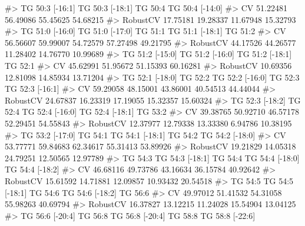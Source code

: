 \documentclass[
  letterpaper,
  DIV=11,
  numbers=noendperiod]{scrreprt}
\newenvironment{Shaded}{\begin{snugshade}}{\end{snugshade}}
\newcommand{\CommentTok}[1]{\textcolor[rgb]{0.37,0.37,0.37}{#1}}
\begin{document}
\begin{Shaded}
\begin{Highlighting}[]
\CommentTok{\#\textgreater{}          TG 50:3 [{-}16:1] TG 50:3 [{-}18:1]  TG 50:4 TG 50:4 [{-}14:0]}
\CommentTok{\#\textgreater{} CV              51.22481        56.49086 55.45625        54.68215}
\CommentTok{\#\textgreater{} RobustCV        17.75181        19.28337 11.67948        15.32793}
\CommentTok{\#\textgreater{}          TG 51:0 [{-}16:0] TG 51:0 [{-}17:0]  TG 51:1 TG 51:1 [{-}18:1]  TG 51:2}
\CommentTok{\#\textgreater{} CV              56.56607        59.99007 54.72579        57.27498 49.21795}
\CommentTok{\#\textgreater{} RobustCV        44.17526        44.26577 11.28402        14.76770 10.99689}
\CommentTok{\#\textgreater{}          TG 51:2 [{-}15:0] TG 51:2 [{-}16:0] TG 51:2 [{-}18:1]  TG 52:1}
\CommentTok{\#\textgreater{} CV              45.62991        51.95672        51.15393 60.16281}
\CommentTok{\#\textgreater{} RobustCV        10.69356        12.81098        14.85934 13.71204}
\CommentTok{\#\textgreater{}          TG 52:1 [{-}18:0]  TG 52:2 TG 52:2 [{-}16:0]  TG 52:3 TG 52:3 [{-}16:1]}
\CommentTok{\#\textgreater{} CV              59.29058 48.15001        43.86001 40.54513        44.44044}
\CommentTok{\#\textgreater{} RobustCV        24.67837 16.23319        17.19055 15.32357        15.60324}
\CommentTok{\#\textgreater{}          TG 52:3 [{-}18:2]  TG 52:4 TG 52:4 [{-}16:0] TG 52:4 [{-}18:1]  TG 53:2}
\CommentTok{\#\textgreater{} CV              39.38765 50.92710        46.57178        52.29451 54.55843}
\CommentTok{\#\textgreater{} RobustCV        12.37977 12.79338        13.33380         6.94786 10.38195}
\CommentTok{\#\textgreater{}          TG 53:2 [{-}17:0]  TG 54:1 TG 54:1 [{-}18:1]  TG 54:2 TG 54:2 [{-}18:0]}
\CommentTok{\#\textgreater{} CV              53.77771 59.84683        62.34617 55.31413        53.89926}
\CommentTok{\#\textgreater{} RobustCV        19.21829 14.05318        24.79251 12.50565        12.97789}
\CommentTok{\#\textgreater{}           TG 54:3 TG 54:3 [{-}18:1]  TG 54:4 TG 54:4 [{-}18:0] TG 54:4 [{-}18:2]}
\CommentTok{\#\textgreater{} CV       46.68116        49.73786 43.16634        36.15784        40.92642}
\CommentTok{\#\textgreater{} RobustCV 15.61592        14.71881 12.09857        10.93432        20.54518}
\CommentTok{\#\textgreater{}           TG 54:5 TG 54:5 [{-}18:1]  TG 54:6 TG 54:6 [{-}18:2]  TG 56:6}
\CommentTok{\#\textgreater{} CV       49.97012        51.41532 54.31058        55.98263 40.69794}
\CommentTok{\#\textgreater{} RobustCV 16.37827        13.12215 11.24028        15.54904 13.04125}
\CommentTok{\#\textgreater{}          TG 56:6 [{-}20:4]  TG 56:8 TG 56:8 [{-}20:4]  TG 58:8 TG 58:8 [{-}22:6]}

\end{Highlighting}
\end{Shaded}
\end{document}
